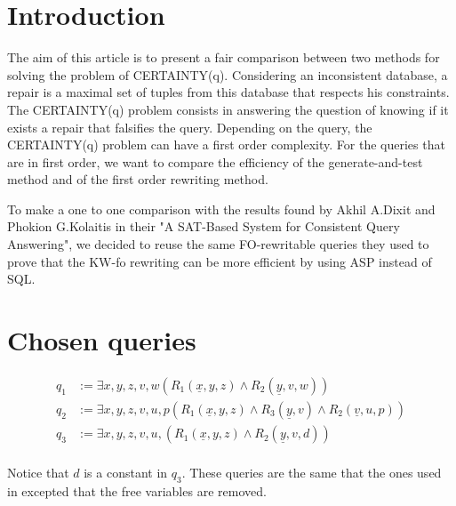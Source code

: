 
\section{Introduction}
The aim of this article is to present a fair comparison between two methods for
solving the problem of CERTAINTY(q). Considering an inconsistent database, a
repair is a maximal set of tuples from this database that respects his
constraints. The CERTAINTY(q) problem consists in answering the question of
knowing if it exists a repair that falsifies the query. Depending on the query,
the CERTAINTY(q) problem can have a first order complexity. For the queries that are in first order, we want to compare the
efficiency of the generate-and-test method and of the first order rewriting
method.

To make a one to one comparison with the results found by Akhil A.Dixit and
Phokion G.Kolaitis in their "A SAT-Based System for Consistent Query
Answering", we decided to reuse the same FO-rewritable queries they used to prove that the KW-fo rewriting can be more efficient by using ASP instead of SQL.


\section{Chosen queries}


\begin{align*}
q_1 &:= \exists x, y, z, v, w (R_1(\underline{x},y,z) \wedge R_2(\underline{y}, v, w))\\
q_2 &:= \exists x, y, z, v, u, p (R_1(\underline{x},y,z) \wedge R_3(\underline{y}, v) \wedge R_2(\underline{v}, u, p)) \\
q_3 &:= \exists x, y, z, v, u, (R_1(\underline{x},y,z) \wedge R_2(\underline{y}, v, d)) \\
\end{align*}

Notice that $d$ is a constant in $q_3$. These queries are the same that the ones used in \cite{DBLP:conf/sat/DixitK19} excepted that the free variables are removed.